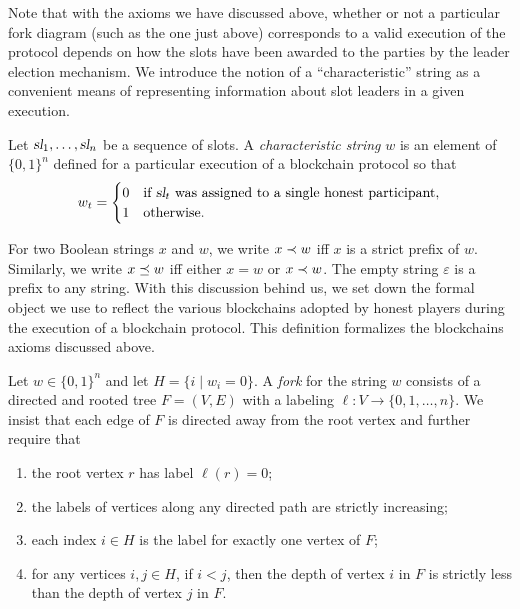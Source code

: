 Note that with the axioms we have discussed above, whether or not a
particular fork diagram (such as the one just above) corresponds to a valid
execution of the protocol depends on how the slots have been awarded to the parties by the
leader election mechanism. We introduce the notion of a ``characteristic'' string as a convenient
means of representing information about slot leaders in a given execution.
\begin{definition}
  Let $\textsl{sl}_1, \ldots, \textsl{sl}_{n}$ be a sequence of slots. A \emph{characteristic string} $w$ is an element of $\{0,1\}^n$ defined for a particular execution of a blockchain protocol so that
  \[
    w_t =   \begin{cases}
    0 & \text{if $\textsl{sl}_{t}$ was assigned to a single honest participant},\\
    1 & \text{otherwise.}
  \end{cases}
\]
\end{definition}
For two Boolean strings $x$ and $w$, 
we write $x \prec w$ iff $x$ is a strict prefix of $w$. 
Similarly, 
we write $x \preceq w$ iff either $x = w$ or $x \prec w$. 
The empty string $\varepsilon$ is a prefix to any string. 
With this discussion behind us, we set down the formal object we use
to reflect the various blockchains adopted by honest players during
the execution of a blockchain protocol. This definition formalizes the blockchains axioms discussed above.


\begin{definition}
  Let $w\in \{0,1\}^n$ and let $H = \{ i \mid w_i = 0\}$. A
  \emph{fork} for the string $w$ consists of a directed and rooted
  tree $F=(V,E)$ with a labeling $\ell:V\to\{0,1,\dots,n\}$. We insist
  that each edge of $F$ is directed away from the root vertex and
  further require that
  \begin{enumerate}[label=(F{\arabic*}.)]
  \item\label{fork:root} the root vertex $r$ has label $\ell(r)=0$;
  \item\label{fork:monotone} the labels of vertices along any directed path are strictly increasing;
  \item\label{fork:unique-honest} each index $i\in H$ is the label for exactly one vertex of $F$;
  \item\label{fork:honest-depth} for any  vertices $i,j\in H$, if $i<j$, then the depth of vertex $i$ in $F$ is strictly less than the depth of vertex $j$ in $F$.
  \end{enumerate}
\end{definition}

